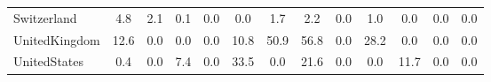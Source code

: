 \begin{table}[htbp]
\begin{tabular}{lcccccccccccc}
Switzerland &       4.8 &       2.1 &       0.1 &       0.0 &       0.0 &       1.7 &       2.2 &       0.0 &       1.0 &       0.0 &       0.0 &       0.0 \\  
UnitedKingdom &      12.6 &       0.0 &       0.0 &       0.0 &      10.8 &      50.9 &      56.8 &       0.0 &      28.2 &       0.0 &       0.0 &       0.0 \\  
UnitedStates &       0.4 &       0.0 &       7.4 &       0.0 &      33.5 &       0.0 &      21.6 &       0.0 &       0.0 &      11.7 &       0.0 &       0.0 \\  
\hline \hline \end{tabular}
\end{table}
